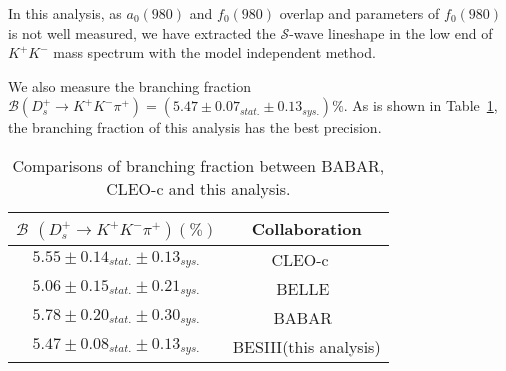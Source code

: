 \documentclass[aps,prd,twocolumn,showpacs,amsmath,amssymb]{revtex4-1}
\begin{document}
    In this analysis, as $a_{0}(980)$ and $f_{0}(980)$ overlap and parameters of $f_{0}(980)$ is not well measured, 
    we have extracted the $\mathcal{S}$-wave lineshape in the low end of $K^{+}K^{-}$ mass spectrum with the model independent method.

    We also measure the branching fraction $\mathcal{B}(D_{s}^{+} \rightarrow K^{+}K^{-}\pi^{+})=(5.47\pm0.07_{stat.}\pm0.13_{sys.})\%$.
    As is shown in Table~\ref{BF-Compare}, the branching fraction of this analysis has the best precision.
    \begin{table}[htbp]
        \caption{Comparisons of branching fraction between BABAR, CLEO-c and this analysis.}
        \label{BF-Compare}
        \begin{center}
            \begin{tabular}{cc}
                \hline\hline
                $\mathcal{B}$ $(D_{s}^{+} \rightarrow K^{+}K^{-}\pi^{+})(\%)$ & Collaboration  \\
                \hline
                $5.55\pm0.14_{stat.}\pm0.13_{sys.}$    &  CLEO-c ~\cite{CLEO-BF}                     \\
                $5.06\pm0.15_{stat.}\pm0.21_{sys.}$    &  BELLE~\cite{BELL-BF}                     \\
                $5.78\pm0.20_{stat.}\pm0.30_{sys.}$    &  BABAR~\cite{BABAR-BF}                    \\
                $5.47\pm0.08_{stat.}\pm0.13_{sys.}$                     &  BESIII(this analysis)    \\
                \hline\hline
            \end{tabular}
        \end{center}
    \end{table}
    
\end{document}
